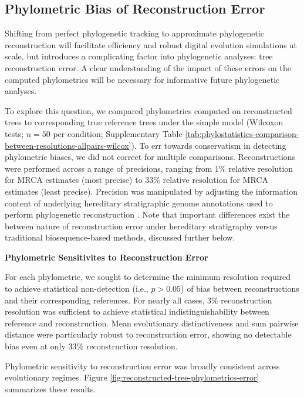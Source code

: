 \subsection{Phylometric Bias of Reconstruction Error}
\label{sec:phylometric-bias-reconstruction-error}

Shifting from perfect phylogenetic tracking to approximate phylogenetic reconstruction will facilitate efficiency and robust digital evolution simulations at scale, but introduces a complicating factor into phylogenetic analyses: tree reconstruction error.
A clear understanding of the impact of these errors on the computed phylometrics will be necessary for informative future phylogenetic analyses.

To explore this question, we compared phylometrics computed on reconstructed trees to corresponding true reference trees under the simple model (Wilcoxon tests; $n=50$ per condition; Supplementary Table \ref{tab:phylostatistics-comparison-between-resolutions-allpairs-wilcox}).
To err towards conservatism in detecting phylometric biases, we did not correct for multiple comparisons.
Reconstructions were performed across a range of precisions, ranging from 1\% relative resolution for MRCA estimates (most precise) to 33\% relative resolution for MRCA estimates (least precise).
Precision was manipulated by adjusting the information content of underlying hereditary stratigraphic genome annotations used to perform phylogenetic reconstruction \citep{moreno2022hereditary}.
Note that important differences exist the between nature of reconstruction error under hereditary stratigraphy versus traditional biosequence-based methods, discussed further below.

\textbf{Phylometric Sensitivites to Reconstruction Error}



For each phylometric, we sought to determine the minimum resolution required to achieve statistical non-detection (i.e., $p > 0.05$) of bias between reconstructions and their corresponding references.
For nearly all cases, 3\% reconstruction resolution was sufficient to achieve statistical indistinguishability between reference and reconstruction.
Mean evolutionary distinctiveness and sum pairwise distance were particularly robust to reconstruction error, showing no detectable bias even at only 33\% reconstruction resolution.

Phylometric sensitivity to reconstruction error was broadly consistent across evolutionary regimes.
Figure \ref{fig:reconstructed-tree-phylometrics-error} summarizes these results.

